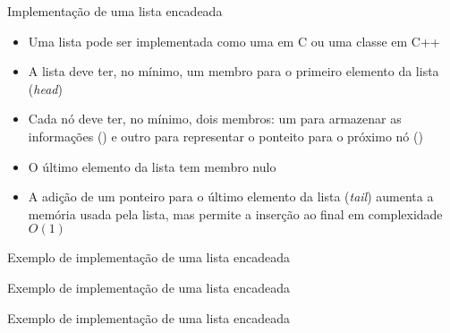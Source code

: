 \begin{frame}[fragile]{Implementação de uma lista encadeada}

    \begin{itemize}
        \item Uma lista pode ser implementada como uma  em C ou uma
            classe em C++

        \item A lista deve ter, no mínimo, um membro para o primeiro elemento da lista
            (\textit{head})

        \item Cada nó deve ter, no mínimo, dois membros: um para armazenar as informações 
            () e outro para representar o ponteito para o próximo nó
            ()

        \item O último elemento da lista tem membro  nulo

        \item A adição de um ponteiro para o último elemento da lista (\textit{tail}) aumenta
            a memória usada pela lista, mas permite a inserção ao final em complexidade $O(1)$
    \end{itemize}

\end{frame}

\begin{frame}[fragile]{Exemplo de implementação de uma lista encadeada}
\end{frame}

\begin{frame}[fragile]{Exemplo de implementação de uma lista encadeada}
\end{frame}

\begin{frame}[fragile]{Exemplo de implementação de uma lista encadeada}
\end{frame}

